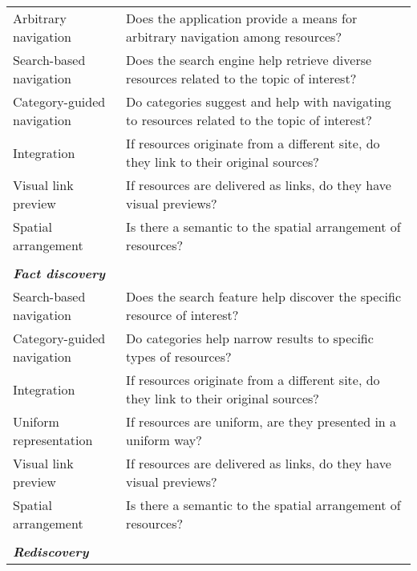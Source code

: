 \documentclass{casconpaper}
\begin{document}
{\begin{table*}[htbp]
\begin{tabular}{|p{0.28\linewidth}|p{0.72\linewidth}|}
Arbitrary navigation         & Does the application provide a means for arbitrary navigation among resources?                              \\
Search-based navigation      & Does the search engine help retrieve diverse resources related to the topic of interest?               \\
Category-guided navigation & Do categories suggest and help with navigating to resources related to the topic of interest?           \\
Integration                  & If resources originate from a different site, do they link to their original sources?                   \\
Visual link preview               & If resources are delivered as links, do they have visual previews?                                                                        \\
Spatial arrangement          & Is there a semantic to the spatial arrangement of resources?                                                    \\
&\\
\emph{\textbf{Fact discovery}}                &                                                                                                           \\
Search-based navigation      & Does the search feature help discover the specific resource of interest?                                  \\
Category-guided navigation & Do categories help narrow results to specific types of resources?                                   \\
Integration                  & If resources originate from a different site, do they link to their original sources?                   \\
Uniform representation       & If resources are uniform, are they presented in a uniform way? \\
Visual link preview               & If resources are delivered as links, do they have visual previews?                                                                        \\
Spatial arrangement          & Is there a semantic to the spatial arrangement of resources?                                                    \\
&\\
\emph{\textbf{Rediscovery}}                     &                                                                                                           \\

\end{tabular}
\end{table*}}
\end{document}
